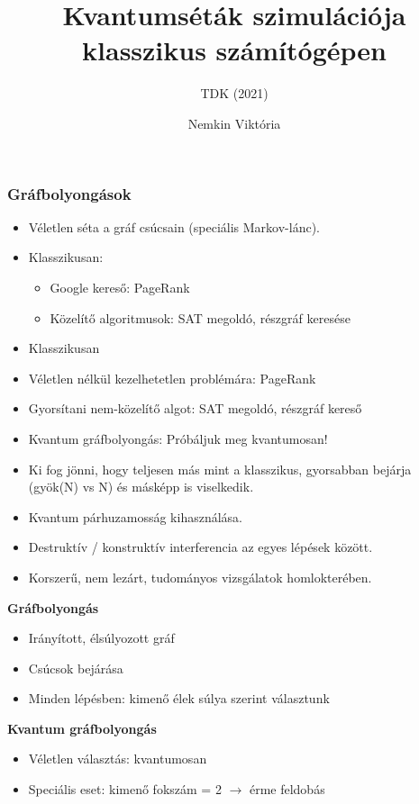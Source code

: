 \documentclass[aspectratio=169]{beamer}
\author{Nemkin Viktória}
\institute{Konzulens: dr. Friedl Katalin}
\title{Kvantumséták szimulációja klasszikus számítógépen}
\subtitle{TDK (2021)}
\date{}
\begin{document}
\frame{\titlepage}

\begin{frame}
  \frametitle{Gráfbolyongások}
  \begin{itemize}
    \item Véletlen séta a gráf csúcsain (speciális Markov-lánc).
    \item Klasszikusan:
    \begin{itemize}
        \item Google kereső: PageRank
        \item Közelítő algoritmusok: SAT megoldó, részgráf keresése
    \end{itemize}
    \item Klasszikusan
        \item Véletlen nélkül kezelhetetlen problémára: PageRank
        \item Gyorsítani nem-közelítő algot: SAT megoldó, részgráf kereső
    \item Kvantum gráfbolyongás: Próbáljuk meg kvantumosan!
    \item Ki fog jönni, hogy teljesen más mint a klasszikus, gyorsabban bejárja (gyök(N) vs N) és másképp is viselkedik.
    \item Kvantum párhuzamosság kihasználása.
    \item Destruktív / konstruktív interferencia az egyes lépések között.
    \item Korszerű, nem lezárt, tudományos vizsgálatok homlokterében.
  \end{itemize}

  \textbf{Gráfbolyongás}
  \begin{itemize}
    \item Irányított, élsúlyozott gráf
    \item Csúcsok bejárása
    \item Minden lépésben: kimenő élek súlya szerint választunk
  \end{itemize}
  \pause
  \textbf{Kvantum gráfbolyongás}
  \begin{itemize}
    \item Véletlen választás: kvantumosan
    \item Speciális eset: kimenő fokszám = 2 $\rightarrow$ érme feldobás
  \end{itemize}
\end{frame}
\end{document}

